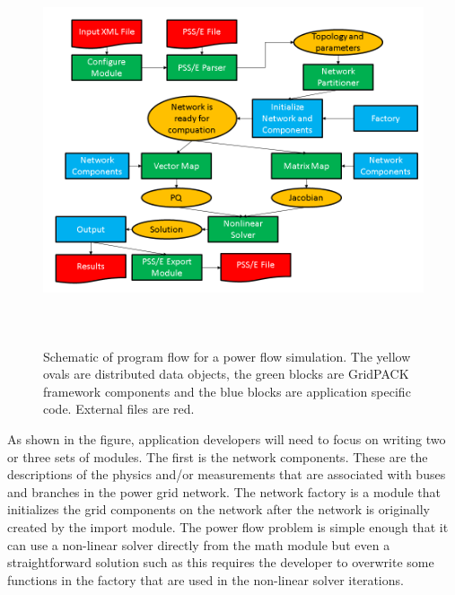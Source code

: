 \begin{figure}
  \centering
    \includegraphics*[width=6.50in, height=4.5in, keepaspectratio=true,
trim=0.00in 0.0in 0.0in 0.0in]{figures/PF-flow-chart}
  \caption{Schematic of program flow for a power flow simulation. The yellow ovals are distributed data objects, the green blocks are GridPACK framework components and the blue blocks are application specific code. External files are red.}
  \label{fig:pf-schematic}
\end{figure}



As shown in the figure, application developers will need to focus on writing two or three sets of modules. The first is the network components. These are the descriptions of the physics and/or measurements that are associated with buses and branches in the power grid network. The network factory is a module that initializes the grid components on the network after the network is originally created by the import module. The power flow problem is simple enough that it can use a non-linear solver directly from the math module but even a straightforward solution such as this requires the developer to overwrite some functions in the factory that are used in the non-linear solver iterations.

